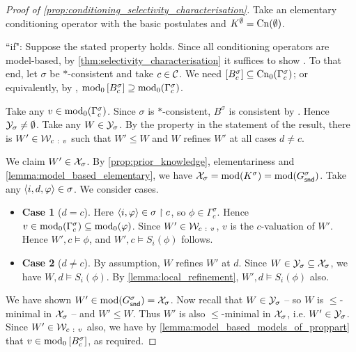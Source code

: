 \begin{proof}[Proof of \cref{prop:conditioning_selectivity_characterisation}]
    Take an elementary conditioning operator with the basic postulates
    and $K^\emptyset = \operatorname{Cn}(\emptyset)$.

    ``if":  Suppose the stated property holds. Since all conditioning operators
    are model-based, by \cref{thm:selectivity_characterisation} it suffices to
    show \boundedness{}. To that end, let $\sigma$ be $\ast$-consistent and
    take $c \in \mathcal{C}$. We need $\left[{B^\sigma_c}\right] \subseteq
    \operatorname{Cn}_0(\Gamma^\sigma_c)$; or equivalently, by \closure{},
    $\operatorname{mod}_0\left[{B^\sigma_c}\right] \supseteq \operatorname{mod}_0(\Gamma^\sigma_c)$.

    Take any $v \in \operatorname{mod}_0(\Gamma^\sigma_c)$. Since $\sigma$ is
    $\ast$-consistent, $B^\sigma$ is consistent by \consistency{}. Hence
    $\mathcal{Y}_\sigma \ne \emptyset$. Take any $W \in \mathcal{Y}_\sigma$. By the property in
    the statement of the result, there is $W' \in \mathcal{W}_{c\ :\ v}$ such that $W'
    \le W$ and $W$ refines $W'$ at all cases $d \ne c$.

    We claim $W' \in \mathcal{X}_\sigma$. By \cref{prop:prior_knowledge}, elementariness
    and \cref{lemma:model_based_elementary}, we have $\mathcal{X}_\sigma =
    \operatorname{mod}(K^\sigma) = \operatorname{mod}(G^\sigma_{\mathsf{snd}})$. Take any $\langle {i, d, \varphi} \rangle \in
    \sigma$. We consider cases.
    \begin{itemize}
        \item \textbf{Case 1} ($d = c$). Here $\langle {i, \varphi} \rangle \in \sigma \upharpoonright
            c$, so $\phi \in \Gamma^\sigma_c$. Hence $v \in
            \operatorname{mod}_0(\Gamma^\sigma_c) \subseteq \operatorname{mod}_0(\varphi)$. Since $W'
            \in \mathcal{W}_{c\ :\ v}$, $v$ is the $c$-valuation of $W'$. Hence $W', c
            \models \phi$, and $W', c \models S_i(\phi)$ follows.

        \item \textbf{Case 2} ($d \ne c$). By assumption, $W$ refines $W'$ at
              $d$. Since $W \in \mathcal{Y}_\sigma \subseteq \mathcal{X}_\sigma$, we have $W, d
              \models S_i(\phi)$. By \cref{lemma:local_refinement}, $W', d
              \models S_i(\phi)$ also.
    \end{itemize}
    We have shown $W' \in \operatorname{mod}(G^\sigma_{\mathsf{snd}}) = \mathcal{X}_\sigma$. Now recall that $W
    \in \mathcal{Y}_\sigma$ -- so $W$ is $\le$-minimal in $\mathcal{X}_\sigma$ -- and $W' \le W$.
    Thus $W'$ is also $\le$-minimal in $\mathcal{X}_\sigma$, i.e. $W' \in \mathcal{Y}_\sigma$.
    Since $W' \in \mathcal{W}_{c\ :\ v}$ also, we have by
    \cref{lemma:model_based_models_of_proppart} that $v \in
    \operatorname{mod}_0\left[{B^\sigma_c}\right]$, as required.


\end{proof}
